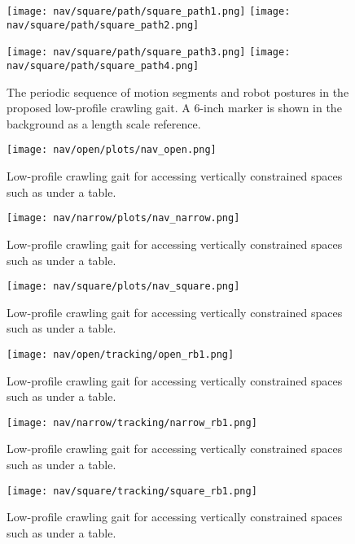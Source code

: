 \begin{figure}
  \centerline{
    \texttt{[image: nav/square/path/square\_path1.png]}
    \texttt{[image: nav/square/path/square\_path2.png]}
  }
  \vspace*{0.05in}
  \centerline{
    \texttt{[image: nav/square/path/square\_path3.png]}
    \texttt{[image: nav/square/path/square\_path4.png]}
  }
    \caption{The periodic sequence of motion segments and robot postures in the proposed low-profile crawling gait. A 6-inch marker is shown in the background as a length scale reference.}
    \label{fig:nav_square_frames1}
        \vspace*{-0.07in}
\end{figure}

\begin{figure}
  \texttt{[image: nav/open/plots/nav\_open.png]}
  \caption{Low-profile crawling gait for accessing vertically constrained spaces such as under a table.}
  \label{fig:nav_open_plot1}
\end{figure}

\begin{figure}
  \texttt{[image: nav/narrow/plots/nav\_narrow.png]}
  \caption{Low-profile crawling gait for accessing vertically constrained spaces such as under a table.}
  \label{fig:nav_narrow_plot1}
\end{figure}

\begin{figure}
  \texttt{[image: nav/square/plots/nav\_square.png]}
  \caption{Low-profile crawling gait for accessing vertically constrained spaces such as under a table.}
  \label{fig:nav_square_plot1}
\end{figure}

\begin{figure}
  \texttt{[image: nav/open/tracking/open\_rb1.png]}
  \caption{Low-profile crawling gait for accessing vertically constrained spaces such as under a table.}
  \label{fig:nav_open_rb1}
\end{figure}

\begin{figure}
  \texttt{[image: nav/narrow/tracking/narrow\_rb1.png]}
  \caption{Low-profile crawling gait for accessing vertically constrained spaces such as under a table.}
  \label{fig:nav_narrow_rb1}
\end{figure}

\begin{figure}
  \texttt{[image: nav/square/tracking/square\_rb1.png]}
  \caption{Low-profile crawling gait for accessing vertically constrained spaces such as under a table.}
  \label{fig:nav_square_rb1}
\end{figure}